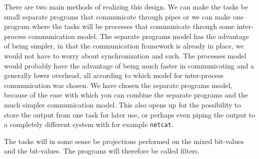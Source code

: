 There are two main methods of realizing this design. We can make the
tasks be small separate programs that communicate through pipes or we
can make one program where the tasks will be processes that
communicate through some inter-process communication model. The
separate programs model has the advantage of being simpler, in that
the communication framework is already in place, we would not have to
worry about synchronization and such. The processes model would
probably have the advantage of being much faster in communicating and
a generally lower overhead, all according to which model for
inter-process communication was chosen. We have chosen the separate
programs model, because of the ease with which you can combine the
separate programs and the much simpler communication model. This also
opens up for the possibility to store the output from one task for
later use, or perhaps even piping the output to a completely different
system with for example \texttt{netcat}. %

The tasks will in some sense be projections performed on the mixed
bit-values and the bit-values. The programs will therefore be called
filters. 


